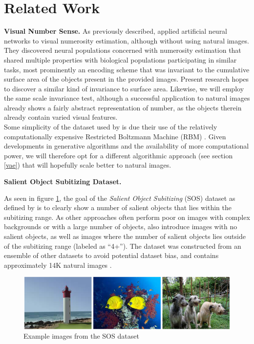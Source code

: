 \documentclass[twocolumn]{article}
\begin{document}
\hypertarget{related-work}{%
\section{Related Work}\label{related-work}}

\newcommand{\relatedss}[2]{{\bfseries #1. }{#2}}

\relatedss{Visual Number Sense}{As previously described, \citet{stoianov2012} applied artificial neural
networks to visual numerosity estimation, although without using natural
images. They discovered neural populations concerned with numerosity
estimation that shared multiple properties with biological populations
participating in similar tasks, most prominently an encoding scheme that
was invariant to the cumulative surface area of the objects present in
the provided images. Present research hopes to discover a similar kind
of invariance to surface area. Likewise, we will employ the same scale
invariance test, although a successful application to natural images
already shows a fairly abstract representation of number, as the objects
therein already contain varied visual features.\\
Some simplicity of the dataset used by \citet{stoianov2012} is due their
use of the relatively computationally expensive Restricted Boltzmann
Machine (RBM) \citep[with the exception of exploiting prior knowledge of
regularities in the probability distribution over the observed data,
equation (20.6) from][ shows that computational cost in RBMs
grows as a multiple of the size of it's hidden and observed
units]{goodfellow2016deep}. Given developments in generative algorithms
and the availability of more computational power, we will therefore opt
for a different algorithmic approach (see section \ref{vae}) that
will hopefully scale better to natural images.} 

\relatedss{Salient Object Subitizing
Dataset}{As seen in figure \ref{fig:sub}, the goal of the
\emph{Salient Object Subitizing} (SOS) dataset as defined by
\citet{zhang2016salient} is to clearly show a number of salient objects
that lies within the subitizing range. As other approaches often perform
poor on images with complex backgrounds or with a large number of
objects, \citet{zhang2016salient} also introduce images with no salient
objects, as well as images where the number of salient objects lies
outside of the subitizing range (labeled as ``4+''). The dataset was
constructed from an ensemble of other datasets to avoid potential
dataset bias, and contains approximately 14K natural images
\citep{zhang2016salient}.

\begin{figure}
\centering
\includegraphics{subitizing.png}
\caption{Example images from the SOS dataset}
\label{fig:sub}
\end{figure}}
\end{document}
